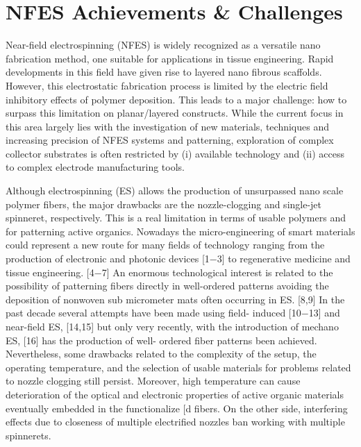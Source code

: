 \documentclass[5p,,preprint,12pt,twocolumn]{elsarticle}
\begin{document}
    
\section{NFES Achievements \& Challenges}
Near-field electrospinning (NFES) is widely recognized as a versatile nano fabrication method, one suitable for applications in tissue engineering. Rapid developments in this field have given rise to layered nano fibrous scaffolds. However, this electrostatic fabrication process is limited by the electric field inhibitory effects of polymer deposition. This leads to a major challenge: how to surpass this limitation on planar/layered constructs. While the current focus in this area largely lies with the investigation of new materials, techniques and increasing precision of NFES systems and patterning, exploration of complex collector substrates is often restricted by (i) available technology and (ii) access to complex electrode manufacturing tools.

Although electrospinning (ES) allows the production of unsurpassed nano scale polymer fibers, the major drawbacks are the nozzle-clogging and single-jet spinneret, respectively. This is a real limitation in terms of usable polymers and for patterning active organics. Nowadays the micro-engineering of smart materials could represent a new route for many fields of technology ranging from the production of electronic and photonic devices [1\ensuremath{-}3] to regenerative medicine and tissue engineering. [4\ensuremath{-}7] An enormous technological interest is related to the possibility of patterning fibers directly in well-ordered patterns avoiding the deposition of nonwoven sub micrometer mats often occurring in ES. [8,9] In the past decade several attempts have been made using field- induced [10\ensuremath{-}13] and near-field ES, [14,15] but only very recently, with the introduction of mechano ES, [16] has the production of well- ordered fiber patterns been achieved. Nevertheless, some drawbacks related to the complexity of the setup, the operating temperature, and the selection of usable materials for problems related to nozzle clogging still persist. Moreover, high temperature can cause deterioration of the optical and electronic properties of active organic materials eventually embedded in the functionalize [d fibers. On the other side, interfering effects due to closeness of multiple electrified nozzles ban working with multiple spinnerets.
    






\end{document}
